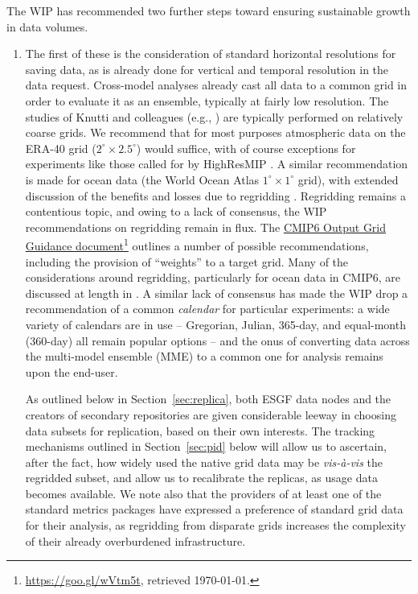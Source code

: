 \documentclass[gmd,manuscript]{copernicus}
\newcommand{\urlref}[2] {\href{#1}{#2}\footnote{\url{#1}, retrieved \today.}}
\begin{document}
The WIP has recommended two further steps toward ensuring sustainable
growth in data volumes.

\begin{enumerate}
\item The first of these is the consideration of standard horizontal
  resolutions for saving data, as is already done for vertical and
  temporal resolution in the data request. Cross-model analyses
  already cast all data to a common grid in order to evaluate it as an
  ensemble, typically at fairly low resolution. The studies of Knutti
  and colleagues (e.g., \cite{ref:knuttietal2017}) are typically
  performed on relatively coarse grids. We recommend that for most
  purposes atmospheric data on the ERA-40 grid
  ($2^\circ\times 2.5^\circ$) would suffice, with of course exceptions
  for experiments like those called for by HighResMIP
  \citep{ref:haarsmaetal2016}. A similar recommendation is made for ocean
  data (the World Ocean Atlas $1^\circ\times 1^\circ$ grid), with
  extended discussion of the benefits and losses due to regridding
  \citep[see][]{ref:griffiesetal2014,ref:griffiesetal2016}.
  Regridding remains a contentious topic, and owing to
  a lack of consensus, the WIP recommendations on regridding remain in
  flux. The \urlref{https://goo.gl/wVtm5t}{CMIP6 Output Grid Guidance
    document} outlines a number of possible recommendations, including
  the provision of ``weights'' to a target grid. Many of the
  considerations around regridding, particularly for ocean data in
  CMIP6, are discussed at length in \cite{ref:griffiesetal2016}. A
  similar lack of consensus has made the WIP drop a recommendation of
  a common \emph{calendar} for particular experiments: a wide variety
  of calendars are in use -- Gregorian, Julian, 365-day, and
  equal-month (360-day) all remain popular options -- and the onus of
  converting data across the multi-model ensemble (MME) to a common
  one for analysis remains upon the end-user.

  As outlined below in Section~\ref{sec:replica}, both ESGF data nodes and the
  creators of secondary repositories are given considerable leeway in
  choosing data subsets for replication, based on their own interests.
  The tracking mechanisms outlined in Section~\ref{sec:pid} below will allow us
  to ascertain, after the fact, how widely used the native grid data
  may be \emph{vis-\`a-vis} the regridded subset, and allow us to
  recalibrate the replicas, as usage data becomes available. We note
  also that the providers of at least one of the standard metrics
  packages \citep[ESMValTool,][]{ref:eyringetal2016a} have expressed a
  preference of standard grid data for their analysis, as regridding
  from disparate grids increases the complexity of their already
  overburdened infrastructure.


\end{enumerate}
\end{document}
